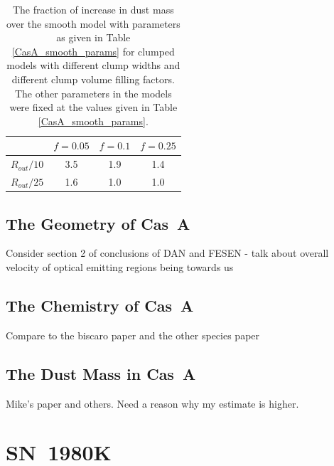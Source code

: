 \begin{table}
\caption{The fraction of increase in dust mass over the smooth model with parameters as given in Table \ref{CasA_smooth_params} for clumped models with different clump widths and different clump volume filling factors.  The other parameters in the models were fixed at the values given in Table \ref{CasA_smooth_params}.}
\centering
\begin{tabular}{l  c c c}
\hline
& $f=0.05$ &$f=0.1$&$f=0.25$\\
\hline
$R_{out}/10$ & 3.5 & 1.9 & 1.4 \\
$R_{out}/25$ & 1.6 & 1.0 & 1.0 \\
\hline
\end{tabular}
\label{CasA_clumped_dust_masses}
\end{table}

\subsection{The Geometry of Cas~A}

Consider section 2 of conclusions of DAN and FESEN - talk about overall velocity of optical emitting regions being towards us

\subsection{The Chemistry of Cas~A}

Compare to the biscaro paper and the other species paper

\subsection{The Dust Mass in Cas~A}

Mike's paper and others.  Need a reason why my estimate is higher.



\clearpage

\section{SN~1980K}

